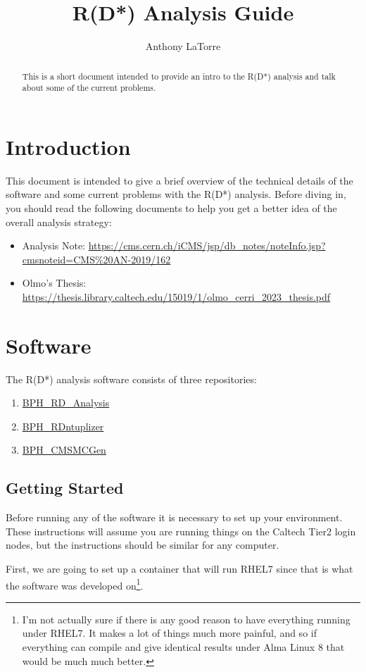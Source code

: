 \documentclass[12pt]{report}
\title{R(D*) Analysis Guide}
\author{Anthony LaTorre}
\begin{document}
\maketitle
\tableofcontents
\begin{abstract}
This is a short document intended to provide an intro to the R(D*) analysis and talk about some of the current problems.
\end{abstract}
\chapter{Introduction}
This document is intended to give a brief overview of the technical details of
the software and some current problems with the R(D*) analysis. Before diving
in, you should read the following documents to help you get a better idea of
the overall analysis strategy:
\begin{itemize}
\item Analysis Note: \url{https://cms.cern.ch/iCMS/jsp/db_notes/noteInfo.jsp?cmsnoteid=CMS%20AN-2019/162}
\item Olmo's Thesis: \url{https://thesis.library.caltech.edu/15019/1/olmo_cerri_2023_thesis.pdf}
\end{itemize}
\chapter{Software}
The R(D*) analysis software consists of three repositories:
\begin{enumerate}
\item \href{https://github.com/alatorre-caltech/BPH\_RD\_Analysis}{BPH\_RD\_Analysis}
\item \href{https://github.com/alatorre-caltech/BPH\_RDntuplizer}{BPH\_RDntuplizer}
\item \href{https://github.com/alatorre-caltech/BPH\_CMSMCGen}{BPH\_CMSMCGen}
\end{enumerate}
\section{Getting Started}
Before running any of the software it is necessary to set up your environment.
These instructions will assume you are running things on the Caltech Tier2
login nodes, but the instructions should be similar for any computer.

First, we are going to set up a container that will run RHEL7 since that is
what the software was developed on\footnote{I'm not actually sure if there is
any good reason to have everything running under RHEL7. It makes a lot of
things much more painful, and so if everything can compile and give identical
results under Alma Linux 8 that would be much much better.}.
\end{document}
